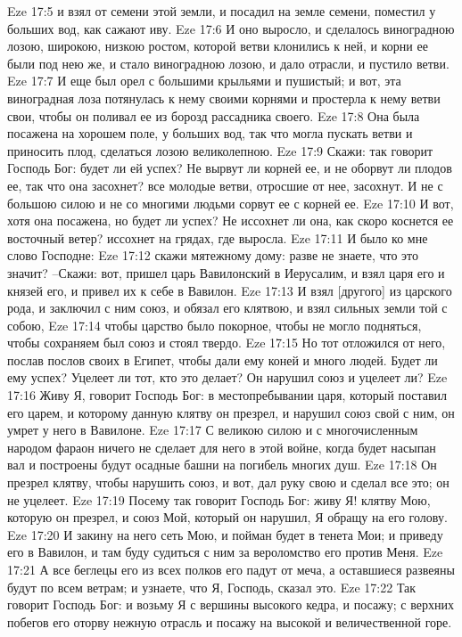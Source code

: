 Eze 17:5  и взял от семени этой земли, и посадил на земле семени, поместил у больших вод, как сажают иву.
Eze 17:6  И оно выросло, и сделалось виноградною лозою, широкою, низкою ростом, которой ветви клонились к ней, и корни ее были под нею же, и стало виноградною лозою, и дало отрасли, и пустило ветви.
Eze 17:7  И еще был орел с большими крыльями и пушистый; и вот, эта виноградная лоза потянулась к нему своими корнями и простерла к нему ветви свои, чтобы он поливал ее из борозд рассадника своего.
Eze 17:8  Она была посажена на хорошем поле, у больших вод, так что могла пускать ветви и приносить плод, сделаться лозою великолепною.
Eze 17:9  Скажи: так говорит Господь Бог: будет ли ей успех? Не вырвут ли корней ее, и не оборвут ли плодов ее, так что она засохнет? все молодые ветви, отросшие от нее, засохнут. И не с большою силою и не со многими людьми сорвут ее с корней ее.
Eze 17:10  И вот, хотя она посажена, но будет ли успех? Не иссохнет ли она, как скоро коснется ее восточный ветер? иссохнет на грядах, где выросла.
Eze 17:11  И было ко мне слово Господне:
Eze 17:12  скажи мятежному дому: разве не знаете, что это значит? --Скажи: вот, пришел царь Вавилонский в Иерусалим, и взял царя его и князей его, и привел их к себе в Вавилон.
Eze 17:13  И взял [другого] из царского рода, и заключил с ним союз, и обязал его клятвою, и взял сильных земли той с собою,
Eze 17:14  чтобы царство было покорное, чтобы не могло подняться, чтобы сохраняем был союз и стоял твердо.
Eze 17:15  Но тот отложился от него, послав послов своих в Египет, чтобы дали ему коней и много людей. Будет ли ему успех? Уцелеет ли тот, кто это делает? Он нарушил союз и уцелеет ли?
Eze 17:16  Живу Я, говорит Господь Бог: в местопребывании царя, который поставил его царем, и которому данную клятву он презрел, и нарушил союз свой с ним, он умрет у него в Вавилоне.
Eze 17:17  С великою силою и с многочисленным народом фараон ничего не сделает для него в этой войне, когда будет насыпан вал и построены будут осадные башни на погибель многих душ.
Eze 17:18  Он презрел клятву, чтобы нарушить союз, и вот, дал руку свою и сделал все это; он не уцелеет.
Eze 17:19  Посему так говорит Господь Бог: живу Я! клятву Мою, которую он презрел, и союз Мой, который он нарушил, Я обращу на его голову.
Eze 17:20  И закину на него сеть Мою, и пойман будет в тенета Мои; и приведу его в Вавилон, и там буду судиться с ним за вероломство его против Меня.
Eze 17:21  А все беглецы его из всех полков его падут от меча, а оставшиеся развеяны будут по всем ветрам; и узнаете, что Я, Господь, сказал это.
Eze 17:22  Так говорит Господь Бог: и возьму Я с вершины высокого кедра, и посажу; с верхних побегов его оторву нежную отрасль и посажу на высокой и величественной горе.
